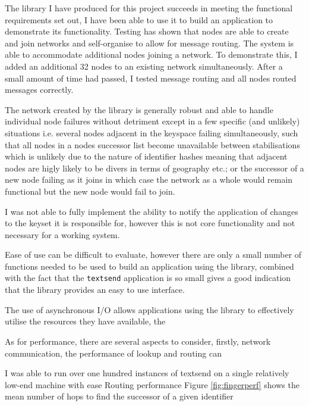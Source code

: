 \documentclass{article}
\begin{document}
The library I have produced for this project succeeds in meeting the functional requirements set out, I have been able to use it to build an application to demonstrate its functionality. Testing has shown that nodes are able to create and join networks and self-organise to allow for message routing. 
The system is able to accommodate additional nodes joining a network. To demonstrate this, I added an additional 32 nodes to an existing network simultaneously. After a small amount of time had passed, I tested message routing and all nodes routed messages correctly.

The network created by the library is generally robust and able to handle individual node failures without detriment except in a few specific (and unlikely) situations i.e. several nodes adjacent in the keyspace failing simultaneously, such that all nodes in a nodes successor list become unavailable between stabilisations which is unlikely due to the nature of identifier hashes meaning that adjacent nodes are higly likely to be divers in terms of geography etc.; or the successor of a new node failing as it joins in which case the network as a whole would remain functional but the new node would fail to join.

I was not able to fully implement the ability to notify the application of changes to the keyset it is responsible for, however this is not core functionality and not necessary for a working system.


Ease of use can be difficult to evaluate, however there are only a small number of functions needed to be used to build an application using the library, combined with the fact that the \texttt{textsend} application is so small gives a good indication that the library provides an easy to use interface.

The use of asynchronous I/O allows applications using the library to effectively utilise the resources they have available, the 


As for performance, there are several aspects to consider, firstly, network communication, the performance of lookup and routing can 

I was able to run over one hundred instances of textsend on a single relatively low-end machine with ease
Routing performance
Figure \ref{fig:fingerperf} shows the mean number of hops to find the successor of a given identifier
\end{document}
